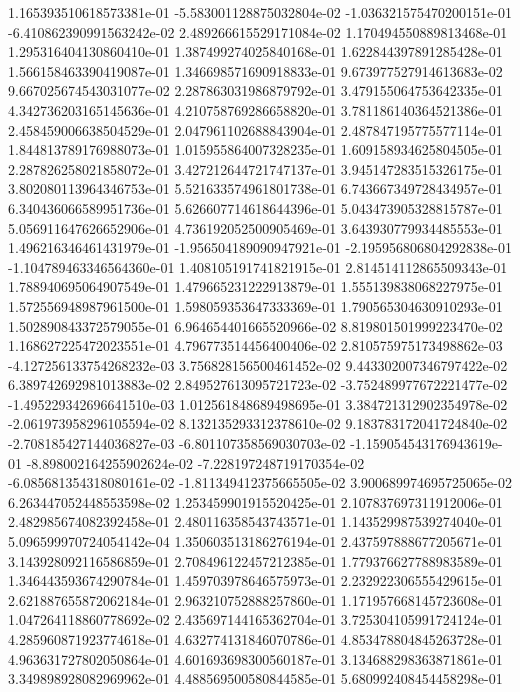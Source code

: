 1.165393510618573381e-01
-5.583001128875032804e-02
-1.036321575470200151e-01
-6.410862390991563242e-02
2.489266615529171084e-02
1.170494550889813468e-01
1.295316404130860410e-01
1.387499274025840168e-01
1.622844397891285428e-01
1.566158463390419087e-01
1.346698571690918833e-01
9.673977527914613683e-02
9.667025674543031077e-02
2.287863031986879792e-01
3.479155064753642335e-01
4.342736203165145636e-01
4.210758769286658820e-01
3.781186140364521386e-01
2.458459006638504529e-01
2.047961102688843904e-01
2.487847195775577114e-01
1.844813789176988073e-01
1.015955864007328235e-01
1.609158934625804505e-01
2.287826258021858072e-01
3.427212644721747137e-01
3.945147283515326175e-01
3.802080113964346753e-01
5.521633574961801738e-01
6.743667349728434957e-01
6.340436066589951736e-01
5.626607714618644396e-01
5.043473905328815787e-01
5.056911647626652906e-01
4.736192052500905469e-01
3.643930779934485553e-01
1.496216346461431979e-01
-1.956504189090947921e-01
-2.195956806804292838e-01
-1.104789463346564360e-01
1.408105191741821915e-01
2.814514112865509343e-01
1.788940695064907549e-01
1.479665231222913879e-01
1.555139838068227975e-01
1.572556948987961500e-01
1.598059353647333369e-01
1.790565304630910293e-01
1.502890843372579055e-01
6.964654401665520966e-02
8.819801501999223470e-02
1.168627225472023551e-01
4.796773514456400406e-02
2.810575975173498862e-03
-4.127256133754268232e-03
3.756828156500461452e-02
9.443302007346797422e-02
6.389742692981013883e-02
2.849527613095721723e-02
-3.752489977672221477e-02
-1.495229342696641510e-03
1.012561848689498695e-01
3.384721312902354978e-02
-2.061973958296105594e-02
8.132135293312378610e-02
9.183783172041724840e-02
-2.708185427144036827e-03
-6.801107358569030703e-02
-1.159054543176943619e-01
-8.898002164255902624e-02
-7.228197248719170354e-02
-6.085681354318080161e-02
-1.811349412375665505e-02
3.900689974695725065e-02
6.263447052448553598e-02
1.253459901915520425e-01
2.107837697311912006e-01
2.482985674082392458e-01
2.480116358543743571e-01
1.143529987539274040e-01
5.096599970724054142e-04
1.350603513186276194e-01
2.437597888677205671e-01
3.143928092116586859e-01
2.708496122457212385e-01
1.779376627788983589e-01
1.346443593674290784e-01
1.459703978646575973e-01
2.232922306555429615e-01
2.621887655872062184e-01
2.963210752888257860e-01
1.171957668145723608e-01
1.047264118860778692e-02
2.435697144165362704e-01
3.725304105991724124e-01
4.285960871923774618e-01
4.632774131846070786e-01
4.853478804845263728e-01
4.963631727802050864e-01
4.601693698300560187e-01
3.134688298363871861e-01
3.349898928082969962e-01
4.488569500580844585e-01
5.680992408454458298e-01
